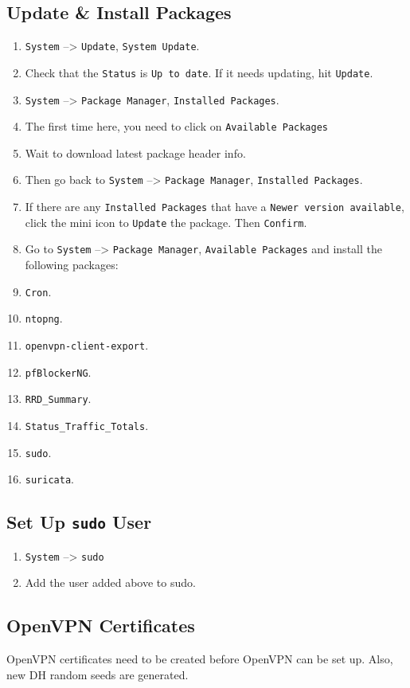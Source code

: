 \subsection{Update \& Install Packages}
\begin{enumerate}
 \item \texttt{System} --> \texttt{Update}, \texttt{System Update}.
 \item Check that the \texttt{Status} is \texttt{Up to date}. If it needs updating, hit \texttt{Update}.
 \item \texttt{System} --> \texttt{Package Manager}, \texttt{Installed Packages}.
 \item The first time here, you need to click on \texttt{Available Packages}
 \item Wait to download latest package header info.
 \item Then go back to \texttt{System} --> \texttt{Package Manager}, \texttt{Installed Packages}.
 \item If there are any \texttt{Installed Packages} that have a \texttt{Newer version available}, click the mini icon to \texttt{Update} the package. Then \texttt{Confirm}.
 \item Go to \texttt{System} --> \texttt{Package Manager}, \texttt{Available Packages} and install the following packages:
 \item \texttt{Cron}.
 \item \texttt{ntopng}.
 \item \texttt{openvpn-client-export}.
 \item \texttt{pfBlockerNG}.
 \item \texttt{RRD\_Summary}.
 \item \texttt{Status\_Traffic\_Totals}.
 \item \texttt{sudo}.
 \item \texttt{suricata}.
\end{enumerate}

\subsection{Set Up \texttt{sudo} User}
\begin{enumerate}
 \item \texttt{System} --> \texttt{sudo}
 \item Add the user added above to sudo.
\end{enumerate}

\subsection{OpenVPN Certificates}
OpenVPN certificates need to be created before OpenVPN can be set up.
Also, new DH random seeds are generated.

